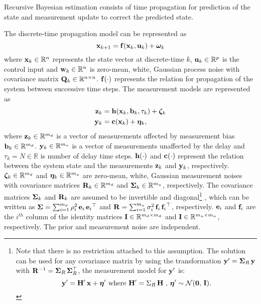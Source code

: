 Recursive Bayesian estimation consists of time propagation for prediction of the state and measurement update to correct the predicted state.

The discrete-time propagation model can be represented as
\begin{equation}
	\label{eqn:StateProp}
	\mathbf{x}_{k+1} = \mathbf{f} (\mathbf{x}_k, \mathbf{u}_k ) + \boldsymbol{\omega}_k
\end{equation}
where $\mathbf{x}_k \in\mathbb{R}^n$ represents the state vector at discrete-time $k$, $\mathbf{u}_k \in \mathbb{R}^p$ is the control input and $\mathbf{w}_k \in \mathbb{R}^n$ is zero-mean, white, Gaussian process noise with covariance matrix $\mathbf{Q}_k \in \mathbb{R}^{n \times n}$. $\mathbf{f} (\cdot)$ represents the relation for propagation of the system between successive time steps.
The measurement models are represented as
\begin{align} 
	\label{eqn:DelayedMeasurement}
	\mathbf{z}_k &= \mathbf{h} ( \mathbf{x}_{k}, \mathbf{b}_{k}, \tau_k ) + \boldsymbol{\zeta}_k \\
	\label{eqn:UndelayedMeasurement}
	\mathbf{y}_k &= \mathbf{c} ( \mathbf{x}_k ) + \boldsymbol{\eta}_k,
\end{align}
where $\mathbf{z}_k \in \mathbb{R}^{m_d}$ is a vector of measurements affected by measurement bias $\mathbf{b}_k \in \mathbb{R}^{m_d}$. $\mathbf{y}_k \in \mathbb{R}^{m_u}$ is a vector of measurements unaffected by the delay and $\tau_k = N \in \mathbb{R}$ is number of delay time steps.
$\mathbf{h}(\cdot)$ and $\mathbf{c}(\cdot)$ represent the relation between the system state and the measurements $\mathbf{z}_k$ and $\mathbf{y}_k$, respectively.
$\boldsymbol{\zeta}_k \in \mathbb{R}^{m_d}$ and $\boldsymbol{\eta}_k \in \mathbb{R}^{m_u}$ are zero-mean, white, Gaussian measurement noises with covariance matrices $\mathbf{R}_k \in \mathbb{R}^{m_d}$ and $\boldsymbol{\Sigma}_k \in \mathbb{R}^{m_u}$, respectively.
The covariance matrices $\boldsymbol{\Sigma}_k$ and $\mathbf{R}_k$ are assumed to be invertible and diagonal\footnote
{\label{ftnt:R_assumption}
	Note that there is no restriction attached to this assumption. The solution can be used for any  covariance matrix by using the transformation $\mathbf{y}' =\boldsymbol{\Sigma}_R  \, \mathbf{y}$ with $\mathbf{R}^{-1} = \boldsymbol{\Sigma}_R \, \boldsymbol{\Sigma}_R^\top$, the measurement model for $\mathbf{y}'$ is:
	$$\mathbf{y}'=\mathbf{H}' \,\mathbf{x}+\boldsymbol{\eta}' \mbox{ where } \mathbf{H}' = \Sigma_R  \, \mathbf{H} \mbox{ , } \boldsymbol{\eta}' \sim \mathcal{N}(\boldsymbol{0},\,\mathbf{I}).$$
}
, which can be written as $\boldsymbol{\Sigma} = \sum_{i=1}^{m_d} \rho_{i}^2 \, \mathbf{e}_i  \,{\mathbf{e}_i}^\top$ and $\mathbf{R} = \sum_{i=1}^{m_u} \sigma_{i}^2 \, \mathbf{f}_i  \,{\mathbf{f}_i}^\top$, respectively. $\mathbf{e}_i$ and $\mathbf{f}_i$ are the $i^{th}$ column of the identity matrices $\mathbf{I} \in \mathbb{R}^{m_d \times m_d}$ and $\mathbf{I} \in \mathbb{R}^{m_u \times m_u}$, respectively.
The prior and measurement noise are independent.

